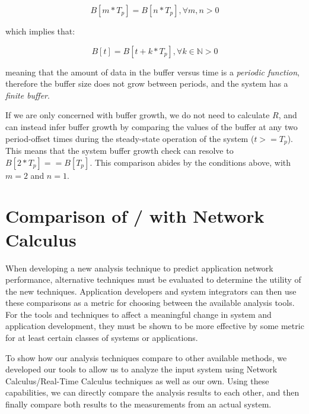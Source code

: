 \begin{equation}
   B[m*T_p] = B[n*T_p], \forall m,n > 0
\end{equation}

which implies that:

\begin{equation}
  B[t] = B[t + k*T_p], \forall k \in \mathbb{N} > 0
\end{equation}

meaning that the amount of data in the buffer versus time is a
\emph{periodic function}, therefore the buffer size does not grow between
periods, and the system has a \emph{finite buffer}.

If we are only concerned with buffer growth, we do not need to
calculate $R$, and can instead infer buffer growth by comparing
the values of the buffer at any two period-offset times during the
steady-state operation of the system ($t >= T_p$).  This means
that the system buffer growth check can resolve to $B[2*T_p] ==
B[T_p]$.  This comparison abides by the conditions above, with
$m=2$ and $n=1$.

\newpage

\section{Comparison of \shorttool/ with Network Calculus}
\label{sec:comparison}

When developing a new analysis technique to predict application
network performance, alternative techniques must be evaluated to
determine the utility of the new techniques.  Application developers
and system integrators can then use these comparisons as a metric for
choosing between the available analysis tools.  For the tools and
techniques to affect a meaningful change in system and application
development, they must be shown to be more effective by some metric
for at least certain classes of systems or applications.

To show how our analysis techniques compare to other available
methods, we developed our tools to allow us to analyze the input
system using Network Calculus/Real-Time Calculus techniques as well as
our own.  Using these capabilities, we can directly compare the
analysis results to each other, and then finally compare both results
to the measurements from an actual system.

